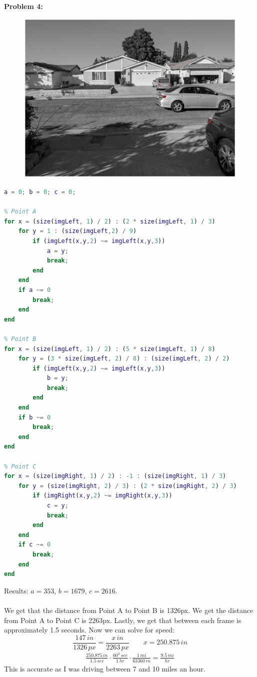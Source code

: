 \documentclass[11pt]{article}
\newenvironment{problem}[1]{\textbf{Problem #1: }}{\newpage}
\begin{document}
\begin{problem}{4}
\begin{figure}[h!]
			\includegraphics[width = 8.cm]{Images/RightSingle}
		\end{figure}
		\newpage
\begin{lstlisting}[language = Matlab]
a = 0; b = 0; c = 0;

% Point A
for x = (size(imgLeft, 1) / 2) : (2 * size(imgLeft, 1) / 3)
	for y = 1 : (size(imgLeft,2) / 9)
		if (imgLeft(x,y,2) ~= imgLeft(x,y,3))
			a = y;
			break;
		end
	end
	if a ~= 0
		break;
	end
end

% Point B
for x = (size(imgLeft, 1) / 2) : (5 * size(imgLeft, 1) / 8)
	for y = (3 * size(imgLeft, 2) / 8) : (size(imgLeft, 2) / 2)
		if (imgLeft(x,y,2) ~= imgLeft(x,y,3))
			b = y;
			break;
		end
	end
	if b ~= 0
		break;
	end
end

% Point C
for x = (size(imgRight, 1) / 2) : -1 : (size(imgRight, 1) / 3)
	for y = (size(imgRight, 2) / 3) : (2 * size(imgRight, 2) / 3)
		if (imgRight(x,y,2) ~= imgRight(x,y,3))
			c = y;
			break;
		end
	end
	if c ~= 0
		break;
	end
end
\end{lstlisting}
	Results: $a = 353$, $b = 1679$, $c = 2616$.  
	\\ \\
	We get that the distance from Point A to Point B is 1326px.  We get the distance from Point A to Point C is 2263px. Lastly, we get that between each frame is approximately 1.5 seconds.  Now we can solve for speed:
	\[\frac{147\,in}{1326\,px} = \frac{x\,in}{2263\,px} \qquad x = 250.875\,in\]
	\begin{align*}
		\frac{250.875\,in}{1.5\,sec} \cdot \frac{60^2\,sec}{1\,hr} \cdot \frac{1\,mi}{63360\,in} = \frac{9.5\,mi}{hr} 
	\end{align*}
	This is accurate as I was driving between 7 and 10 miles an hour.
	\end{problem}
\end{document}
